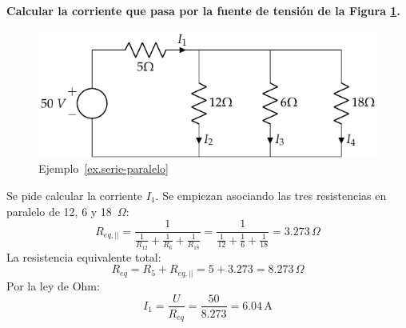 	
	\begin{example}\label{ex.serie-paralelo}
          \textbf{Calcular la corriente que pasa por la fuente de
            tensión de la Figura \ref{fig:ejercicio1_tema1}.}
          \begin{figure}[H]
            \centering \includegraphics{../figs/ej1_BT1.pdf}
            \caption{Ejemplo~\ref{ex.serie-paralelo}}
            \label{fig:ejercicio1_tema1}
          \end{figure}
		
          Se pide calcular la corriente $I_1$. Se empiezan asociando
          las tres resistencias en paralelo de 12, 6 y 18~$\Omega$:
          \begin{equation*}
            R_{eq,||}=\dfrac{1}{\frac{1}{R_{12}}+\frac{1}{R_{6}}+\frac{1}{R_{18}}}=\dfrac{1}{\frac{1}{12}+\frac{1}{6}+\frac{1}{18}}=3.273\,\Omega
          \end{equation*}
          La resistencia equivalente total:
          \begin{equation*}
            R_{eq}=R_5+R_{eq,||}=5+3.273=8.273\,\Omega
          \end{equation*}
          Por la ley de Ohm:
          \begin{equation*}
            I_1=\dfrac{U}{R_{eq}}=\dfrac{50}{8.273}={6.04\,\text{A}}
          \end{equation*}
	\end{example}
	
	
	
